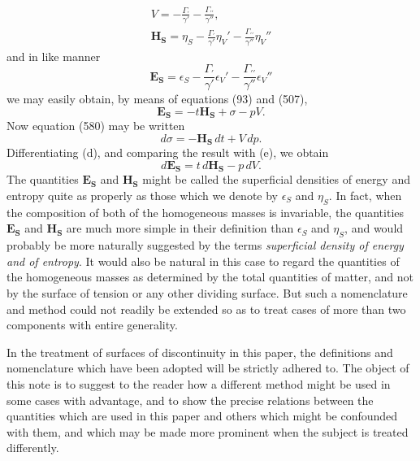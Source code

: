 \documentclass[12pt]{article}
\begin{document}
{{\begin{gather} 
V=-\frac{\Gamma_{\prime}}{\gamma'}-\frac{\Gamma_{\prime \prime}}{\gamma''},   \tag{a}\\
\mathbf{H}_\mathbf{S}=\eta_S-\frac{\Gamma_{\prime}}{\gamma'}\eta_{V}' -\frac{\Gamma_{\prime \prime}}{\gamma''}\eta_{V}'' \tag{b}\end{gather}
and in like manner
\begin{equation}
\mathbf{E}_\mathbf{S}=\epsilon_S-\frac{\Gamma_{\prime}}{\gamma'}\epsilon_{V}' -\frac{\Gamma_{\prime \prime}}{\gamma''}\epsilon_{V}'' \tag{c} \end{equation}
we may easily obtain, by means of equations (93) and (507),
\begin{equation} \mathbf{E}_\mathbf{S}=-t\mathbf{H}_\mathbf{S}+ \sigma -pV. \tag{d} \end{equation}
Now equation (580) may be written
\begin{equation} d\sigma = -\mathbf{H}_\mathbf{S} \, dt + V \, dp. \tag{e} \end{equation}
Differentiating (d), and comparing the result with (e), we obtain
\begin{equation}
d\mathbf{E}_\mathbf{S}=t\,d\mathbf{H}_\mathbf{S}-p \, dV. \tag{f} \end{equation}
The quantities $\mathbf{E}_\mathbf{S}$ and $\mathbf{H}_\mathbf{S}$ might be called the superficial densities of energy and entropy quite as properly as those which we denote by $\epsilon_S$ and $\eta_S$. In fact, when the composition of both of the homogeneous masses is invariable, the quantities $\mathbf{E}_\mathbf{S}$ and $\mathbf{H}_\mathbf{S}$ are much more simple in their definition than $\epsilon_S$ and $\eta_S$, and would probably be more naturally suggested by the terms \textit{superficial density of energy and of entropy}. It would also be natural in this case to regard the quantities of the homogeneous masses as determined by the total quantities of matter, and not by the surface of tension or any other dividing surface. But such a nomenclature and method could not readily be extended so as to treat cases of more than two components with entire generality. \par
In the treatment of surfaces of discontinuity in this paper, the definitions and nomenclature which have been adopted will be strictly adhered to. The object of this note is to suggest to the reader how a different method might be used in some cases with advantage, and to show the precise relations between the quantities which are used in this paper and others which might be confounded with them, and which may be made more prominent when the subject is treated differently.}

}
\end{document}
